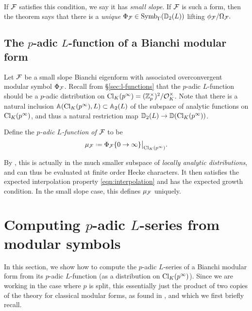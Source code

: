\documentclass[a4paper,11pt]{article}
\numberwithin{equation}{section}
\begin{document}
If $\mathcal{F}$ satisfies this condition, we say it has \emph{small slope}. If $\mathcal{F}$ is such a form, then the theorem says that there is a \emph{unique} $\Phi_{\mathcal{F}} \in \mathrm{Symb}_\Gamma(\mathbb{D}_2(L))$ lifting $\phi_{\mathcal{F}}/\Omega_{\mathcal{F}}.$ 


\subsection{The $p$-adic $L$-function of a Bianchi modular form}\label{padic lfunction section}

Let $\mathcal{F}$ be a small slope Bianchi eigenform with associated overconvergent modular symbol $\Phi_{\mathcal{F}}$. Recall from \S\ref{sec:l-functions} that the $p$-adic $L$-function should be a $p$-adic distribution on $\mathrm{Cl}_K(p^\infty) = (\mathbb{Z}_p^\times)^2/\mathcal{O}_K^\times$. Note that there is a natural inclusion $\mathbb{A}(\mathrm{Cl}_K(p^\infty),L) \subset \mathbb{A}_2(L)$
of the subspace of analytic functions on $\mathrm{Cl}_K(p^\infty)$, and thus a natural restriction map $\mathbb{D}_2(L) \to \mathbb{D}(\mathrm{Cl}_K(p^\infty))$.

\begin{definition} 
Define the \emph{$p$-adic $L$-function of $\mathcal{F}$} to be
\[
	\mu_{\f} \defeq \Phi_{\f}\{0 \to \infty\}\big|_{\cl_K(p^\infty)}.
\]
\end{definition}

By \cite[Thm.~7.4]{Wil17}, this is actually in the much smaller subspace of \emph{locally analytic distributions}, and can thus be evaluated at finite order Hecke characters. It then satisfies the expected interpolation property \eqref{eqn:interpolation} and has the expected growth condition. In the small slope case, this defines $\mu_{\mathcal{F}}$ uniquely.

\section{Computing \texorpdfstring{$p$}{p}-adic \texorpdfstring{$L$}{L}-series from modular symbols}
In this section, we show how to compute the $p$-adic $L$-series of a Bianchi modular form from its $p$-adic $L$-function (as a distribution on $\mathrm{Cl}_K(p^\infty)$). Since we are working in the case where $p$ is split, this essentially just the product of two copies of the theory for classical modular forms, as found in \cite[\S9]{PS11}, and which we first briefly recall.
\end{document}
